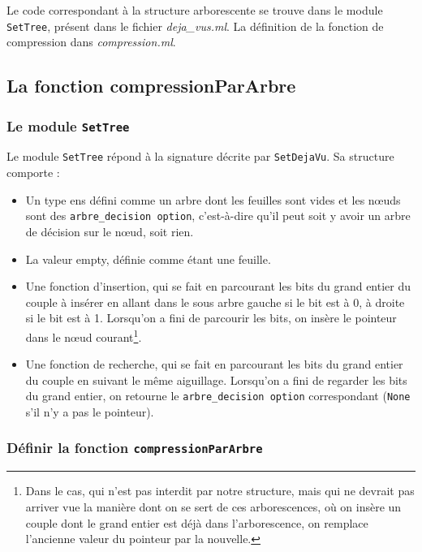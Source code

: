 \documentclass[12pt,a4paper]{article}
\begin{document}
Le code correspondant à la structure arborescente se trouve dans le module \texttt{SetTree}, présent dans le fichier \textit{deja\_vus.ml}. La définition de la fonction de compression dans \textit{compression.ml}.

\subsection{La fonction compressionParArbre}

\subsubsection{Le module \texttt{SetTree}}
Le module \texttt{SetTree} répond à la signature décrite par \texttt{SetDejaVu}. Sa structure comporte : 


\begin{itemize}
\item Un type ens défini comme un arbre dont les feuilles sont vides et les nœuds sont des \texttt{arbre\_decision option}, c'est-à-dire qu'il peut soit y avoir un arbre de décision sur le nœud, soit rien.

\item La valeur empty, définie comme étant une feuille.

\item Une fonction d'insertion, qui se fait en parcourant les bits du grand entier du couple à insérer en allant dans le sous arbre gauche si le bit est à 0, à droite si le bit est à 1. Lorsqu'on a fini de parcourir les bits, on insère le pointeur dans le nœud courant\footnote{Dans le cas, qui n'est pas interdit par notre structure, mais qui ne devrait pas arriver vue la manière dont on se sert de ces arborescences, où on insère un couple dont le grand entier est déjà dans l'arborescence, on remplace l'ancienne valeur du pointeur par la nouvelle.}. 

\item Une fonction de recherche, qui se fait en parcourant les bits du grand entier du couple en suivant le même aiguillage. Lorsqu'on a fini de regarder les bits du grand entier, on retourne le \texttt{arbre\_decision option} correspondant (\texttt{None} s'il n'y a pas le pointeur).
\end{itemize} 


\subsubsection{Définir la fonction \texttt{compressionParArbre}}
\end{document}
